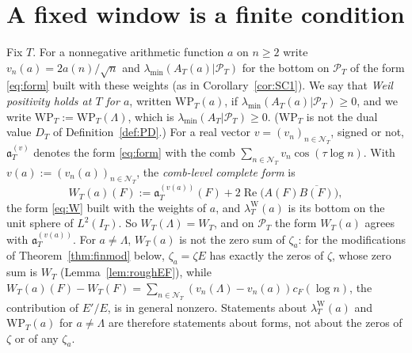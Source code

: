 \documentclass[11pt]{amsart}
\theoremstyle{definition}
\theoremstyle{remark}
\newcommand{\Rel}{\operatorname{Re}}
\newcommand{\PT}{\mathcal P_T}
\newcommand{\IT}{I_T}
\newcommand{\lamA}{\lambda_{\min}(A_T|\PT)}
\newcommand{\cF}{c_F}
\newcommand{\NT}{\mathcal N_T}
\begin{document}
\section{A fixed window is a finite condition}\label{subsec:finite}

Fix $T$. For a nonnegative arithmetic function $a$ on $n\ge2$ write $v_n(a)=2a(n)/\sqrt n$ and
$\lambda_{\min}(A_T(a)|\PT)$ for the bottom on $\PT$ of the form \eqref{eq:form} built with these weights
(as in Corollary~\ref{cor:SC1}). We say that \emph{Weil positivity holds at $T$ for $a$}, written
$\mathrm{WP}_T(a)$, if $\lambda_{\min}(A_T(a)|\PT)\ge0$, and we write $\mathrm{WP}_T:=\mathrm{WP}_T(\Lambda)$, which is
$\lamA\ge0$. ($\mathrm{WP}_T$ is not the dual value $D_T$ of Definition~\ref{def:PD}.) For a real vector
$v=(v_n)_{n\in\NT}$, signed or not, $\mathfrak a^{(v)}_T$ denotes the form \eqref{eq:form} with the comb
$\sum_{n\in\NT}v_n\cos(\tau\log n)$. With $v(a):=(v_n(a))_{n\in\NT}$, the \emph{comb-level complete form} is
\[
W_T(a)(F):=\mathfrak a^{(v(a))}_T(F)+2\Rel\big(A(F)\overline{B(F)}\big),
\]
the form \eqref{eq:W} built with the weights of $a$, and $\lambda^{\mathrm W}_T(a)$ is its bottom on the unit sphere of
$L^2(\IT)$. So $W_T(\Lambda)=W_T$, and on $\PT$ the form $W_T(a)$ agrees with $\mathfrak a^{(v(a))}_T$. For
$a\ne\Lambda$, $W_T(a)$ is not the zero sum of $\zeta_a$: for the modifications of Theorem~\ref{thm:finmod}
below, $\zeta_a=\zeta E$ has exactly the zeros of $\zeta$, whose zero sum is $W_T$ (Lemma~\ref{lem:roughEF}),
while $W_T(a)(F)-W_T(F)=\sum_{n\in\NT}(v_n(\Lambda)-v_n(a))\cF(\log n)$, the contribution of $E'/E$, is in
general nonzero. Statements about $\lambda^{\mathrm W}_T(a)$ and $\mathrm{WP}_T(a)$ for $a\ne\Lambda$ are therefore
statements about forms, not about the zeros of $\zeta$ or of any $\zeta_a$.
\end{document}
